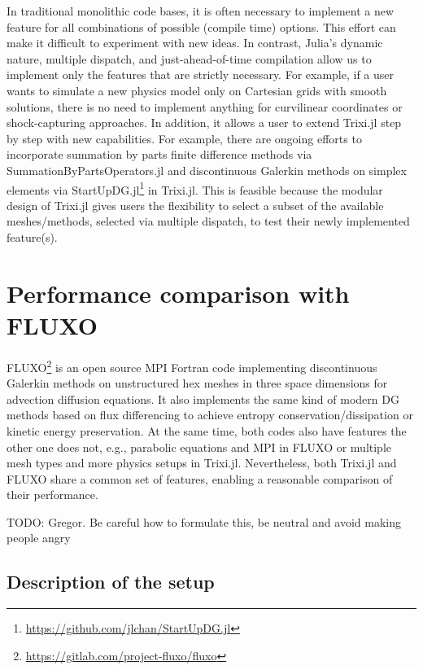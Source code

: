 \documentclass{juliacon}
\makeatletter
\newcommand{\eg}[0]{{e.g.\@}\xspace}
\newcommand{\trixi}{Trixi.jl\xspace}
\newcommand{\todo}[1]{{\color{red}#1}}
\makeatother
\begin{document}
In traditional monolithic code bases, it is often necessary to implement a new
feature for all combinations of possible (compile time) options. This effort
can make it difficult to experiment with new ideas. In contrast, Julia's dynamic
nature, multiple dispatch, and just-ahead-of-time compilation allow us to implement only the features
that are strictly necessary. For example, if a user wants to simulate a new
physics model only on Cartesian grids with smooth solutions, there is no need
to implement anything for curvilinear coordinates or shock-capturing approaches.
In addition, it allows a user to extend \trixi step by step with new capabilities.
For example, there are ongoing efforts to incorporate summation by parts finite
difference methods via SummationByPartsOperators.jl \cite{ranocha2021sbp} and
discontinuous Galerkin methods on simplex elements via StartUpDG.jl\footnote{\url{https://github.com/jlchan/StartUpDG.jl}} in \trixi.
This is feasible because the modular design of \trixi gives users the flexibility to select
a subset of the available meshes/methods, selected via multiple dispatch,
to test their newly implemented feature(s).



\section{Performance comparison with FLUXO}
\label{sec:performance-comparison}

FLUXO\footnote{\url{https://gitlab.com/project-fluxo/fluxo}} is an open source
MPI Fortran code implementing discontinuous Galerkin methods on unstructured hex
meshes in three space dimensions for advection diffusion equations. It also
implements the same kind of modern DG methods based on flux differencing
to achieve entropy conservation/dissipation or kinetic energy preservation.
At the same time, both codes also have features the other one does not, \eg,
parabolic equations and MPI in FLUXO or multiple mesh types and more physics setups
in \trixi. Nevertheless, both \trixi and FLUXO share a common set of features,
enabling a reasonable comparison of their performance.

\todo{TODO: Gregor. Be careful how to formulate this, be neutral and avoid making people angry} %

\subsection{Description of the setup}
\end{document}
